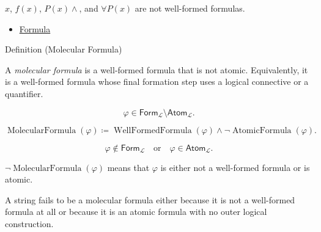 \begin{remark*}
\(x\), \(f(x)\), \(P(x)\land\), and \(\forall P(x)\) are not well-formed
formulas.
\end{remark*}

\begin{dependencies}
\begin{itemize}
  \item \hyperref[def:formula]{Formula}
\end{itemize}
\end{dependencies}

\begin{definitionbox}{Definition (Molecular Formula)}
\begin{definition}
\label{def:molecular}
A \emph{molecular formula} is a well-formed formula that is not atomic.
Equivalently, it is a well-formed formula whose final formation step uses a
logical connective or a quantifier.
\end{definition}
\end{definitionbox}

\begin{remark*}
\[
\varphi\in\mathsf{Form}_{\mathcal L}\setminus\mathsf{Atom}_{\mathcal L}.
\]
\end{remark*}

\begin{remark*}
\[
\operatorname{MolecularFormula}(\varphi)
\coloneqq
\operatorname{WellFormedFormula}(\varphi)
\land
\neg\operatorname{AtomicFormula}(\varphi).
\]
\end{remark*}

\begin{remark*}
\[
\varphi\notin\mathsf{Form}_{\mathcal L}
\quad\text{or}\quad
\varphi\in\mathsf{Atom}_{\mathcal L}.
\]
\end{remark*}

\begin{remark*}
\(\neg\operatorname{MolecularFormula}(\varphi)\) means that \(\varphi\) is
either not a well-formed formula or is atomic.
\end{remark*}

\begin{remark*}
A string fails to be a molecular formula either because it is not a
well-formed formula at all or because it is an atomic formula with no outer
logical construction.
\end{remark*}

